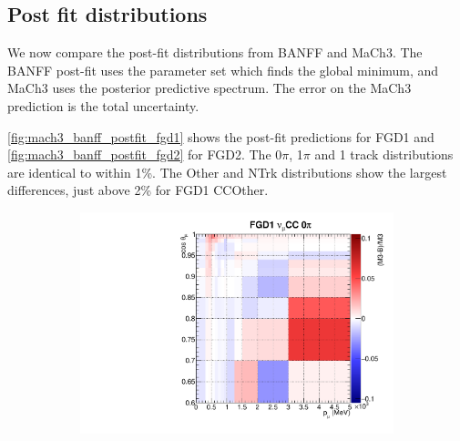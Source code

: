 \subsection{Post fit distributions}
We now compare the post-fit \pmu distributions from BANFF and MaCh3. The BANFF post-fit uses the parameter set which finds the global minimum, and MaCh3 uses the posterior predictive spectrum. The error on the MaCh3 prediction is the total uncertainty.

\autoref{fig:mach3_banff_postfit_fgd1} shows the post-fit predictions for FGD1 and \autoref{fig:mach3_banff_postfit_fgd2} for FGD2. The 0$\pi$, 1$\pi$ and 1 track distributions are identical to within 1\%. The Other and NTrk distributions show the largest differences, just above 2\% for FGD1 CCOther.
\begin{figure}
	\begin{subfigure}[t]{0.10\textwidth}
          \includegraphics[width=\textwidth, trim={0mm 0mm 0mm 0mm}, clip, page=2]{figures/mach3/banff/postfit_comp}
	\end{subfigure}


\end{figure}
